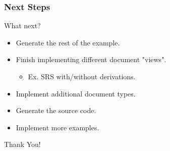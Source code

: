 \documentclass{beamer}
\begin{document}
\begin{frame}

\frametitle{Next Steps}


\begin{Large}
What next?
\end{Large}

\begin{itemize}
\item Generate the rest of the example.
\item Finish implementing different document "views".
\begin{itemize}
\item Ex. SRS with/without derivations.
\end{itemize}
\item Implement additional document types.
\item Generate the source code. %
\item Implement more examples.
\end{itemize}
\end{frame}


\begin{frame}
\begin{center}
\Huge Thank You!
\end{center}
\end{frame}

\end{document}
